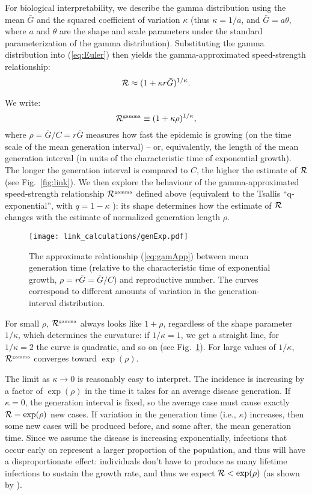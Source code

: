 \documentclass[12pt]{article}
\newcommand{\RR}{\ensuremath{{\cal R}}}
\newcommand{\Tc}{\ensuremath{C}}
\newcommand{\eref}[1]{(\ref{eq:#1})}
\newcommand{\fref}[1]{Fig.~\ref{fig:#1}}
\newcommand{\tsup}[2]{#1^{{\textrm{\tiny #2}}}}
\newcommand{\qexp}{\tsup{\RR}{gamma}}
\begin{document}
For biological interpretability, we describe the gamma distribution using the mean $\bar G$ and the squared coefficient of variation $\kappa$ (thus $\kappa = 1/a$, and $\bar G = a\theta$, where $a$ and $\theta$ are the shape and scale parameters under the standard parameterization of the gamma distribution).
Substituting the gamma distribution into \eref{Euler} then yields the gamma-approximated speed-strength relationship:
\begin{equation}
	\RR \approx (1 + \kappa r \bar G)^{1/\kappa}.
	\label{eq:gamApp}
\end{equation}

We write:
\begin{equation}
 	 \qexp \equiv (1 + \kappa \rho)^{1/\kappa},
	\label{eq:genExp}
\end{equation}
where $\rho = \bar G/\Tc = r\bar G$ measures how fast the epidemic is growing (on the time scale of the mean generation interval) -- or, equivalently, the length of the mean generation interval (in units of the characteristic time of exponential growth).
The longer the generation interval is compared to $\Tc$, the higher the estimate of $\RR$ (see \fref{link}).
We then explore the behaviour of the gamma-approximated speed-strength relationship $\qexp$ defined above (equivalent to the Tsallis ``q-exponential'', with $q=1-\kappa$ \cite{tsallis1994numbers}): its shape determines how the estimate of $\RR$ changes with the estimate of normalized generation length $\rho$.

\begin{figure}[htbp]
	\centering \texttt{[image: link\_calculations/genExp.pdf]}
	\caption{
		The approximate relationship \eref{gamApp} between mean
		generation time (relative to the characteristic time of
		exponential growth, $\rho = r \bar G = \bar G/\Tc$)
		and reproductive number.
		The curves correspond to different
		amounts of variation in the generation-interval
		distribution. 
	} \label{fig:genExp} 
\end{figure}

For small $\rho$, $\qexp$ always looks like $1+\rho$, regardless of the shape parameter $1/\kappa$, which determines the curvature: if $1/\kappa = 1$, we get a straight line, for $1/\kappa=2$ the curve is quadratic, and so on (see \fref{genExp}).
For large values of $1/\kappa$, $\qexp$ converges toward $\exp(\rho)$.

The limit as $\kappa\to 0$ is reasonably easy to interpret. The incidence is increasing by a factor of $\exp(\rho)$ in the time it takes for an average disease generation. If $\kappa=0$, the generation interval is fixed, so the average case must cause exactly $\RR = \exp(\rho)$ new cases.
If variation in the generation time (i.e., $\kappa$) increases, then some new cases will be produced before, and some after, the mean generation time.
Since we assume the disease is increasing exponentially, infections that occur early on represent a larger proportion of the population, and thus will have a disproportionate effect: individuals don't have to produce as many lifetime infections to sustain the growth rate, and thus we expect  $\RR < \exp(\rho)$
(as shown by \cite{WallLips07}).
\end{document}
